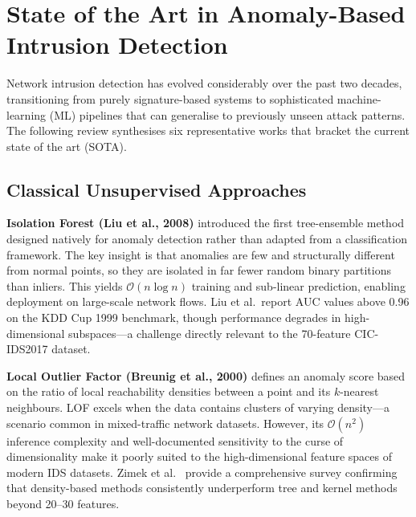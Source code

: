 
\section{State of the Art in Anomaly-Based Intrusion Detection}

Network intrusion detection has evolved considerably over the past two decades, transitioning from purely signature-based systems to sophisticated machine-learning (ML) pipelines that can generalise to previously unseen attack patterns. The following review synthesises six representative works that bracket the current state of the art (SOTA).

\subsection{Classical Unsupervised Approaches}

\textbf{Isolation Forest (Liu et al., 2008)} \cite{liu2008isolation} introduced the first tree-ensemble method designed natively for anomaly detection rather than adapted from a classification framework. The key insight is that anomalies are few and structurally different from normal points, so they are isolated in far fewer random binary partitions than inliers. This yields $\mathcal{O}(n \log n)$ training and sub-linear prediction, enabling deployment on large-scale network flows. Liu et al.\ report AUC values above 0.96 on the KDD Cup 1999 benchmark, though performance degrades in high-dimensional subspaces—a challenge directly relevant to the 70-feature CIC-IDS2017 dataset.

\textbf{Local Outlier Factor (Breunig et al., 2000)} \cite{breunig2000lof} defines an anomaly score based on the ratio of local reachability densities between a point and its $k$-nearest neighbours. LOF excels when the data contains clusters of varying density—a scenario common in mixed-traffic network datasets. However, its $\mathcal{O}(n^2)$ inference complexity and well-documented sensitivity to the curse of dimensionality \cite{zimek2012survey} make it poorly suited to the high-dimensional feature spaces of modern IDS datasets. Zimek et al.\ \cite{zimek2012survey} provide a comprehensive survey confirming that density-based methods consistently underperform tree and kernel methods beyond 20–30 features.

